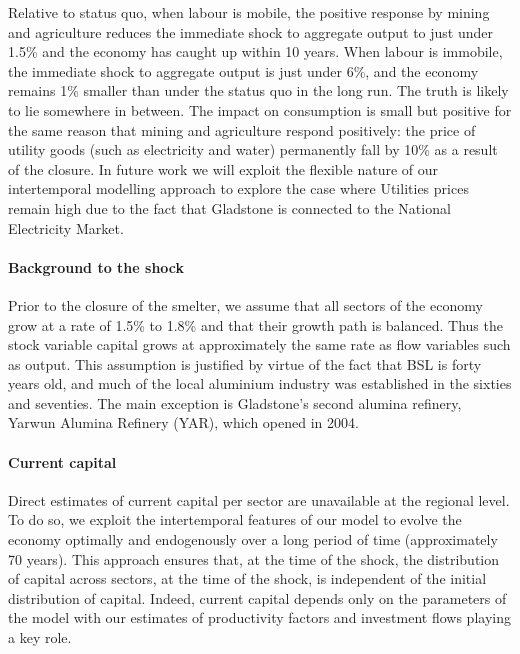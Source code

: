 \documentclass[12pt,a4paper]{article}
\begin{document}
Relative to status quo, when labour is mobile, the positive response by mining
and agriculture reduces the immediate shock to aggregate output to just under
1.5\% and the economy has caught up within 10 years.  When labour is immobile,
the immediate shock to aggregate output is just under 6\%, and the economy
remains 1\% smaller than under the status quo in the long run. The truth is
likely to lie somewhere in between. The impact on consumption is small but
positive for the same reason that mining and agriculture respond positively:
the price of utility goods (such as electricity and water) permanently fall by
10\% as a result of the closure. In future work we will exploit the flexible
nature of our intertemporal modelling approach to explore the case where
Utilities prices remain high due to the fact that Gladstone is connected to the
National Electricity Market.


\paragraph{Background to the shock} Prior to the closure of the smelter, we
assume that all sectors of the economy grow at a rate of 1.5\% to 1.8\% and
that their growth path is balanced. Thus the stock variable capital grows at
approximately the same rate as flow variables such as output.  This assumption
is justified by virtue of the fact that BSL is forty years old, and much of the
local aluminium industry was established in the sixties and seventies.  The
main exception is Gladstone's second alumina refinery, Yarwun Alumina Refinery
(YAR), which opened in 2004.

\paragraph{Current capital} Direct estimates of current capital per sector are
unavailable at the regional level. To do so, we exploit the intertemporal
features of our model to evolve the economy optimally and endogenously over a
long period of time (approximately 70 years).  This approach ensures that, at
the time of the shock, the distribution of capital across sectors, at the time
of the shock, is independent of the initial distribution of capital.  Indeed,
current capital depends only on the parameters of the model with our estimates
of productivity factors and investment flows playing a key role. 
\end{document}
